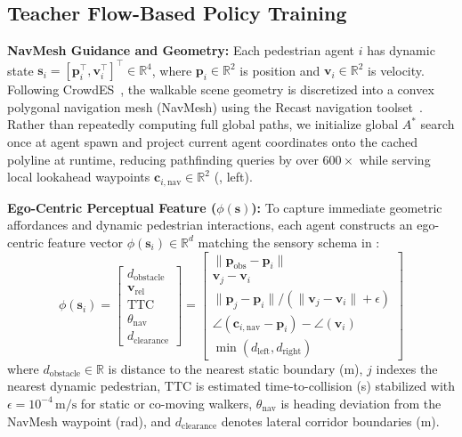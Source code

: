 \documentclass{sice-si}
\begin{document}
\subsection{Teacher Flow-Based Policy Training}
\textbf{NavMesh Guidance and Geometry:} 
Each pedestrian agent $i$ has dynamic state $\mathbf{s}_i = [\mathbf{p}_i^\top, \mathbf{v}_i^\top]^\top \in \mathbb{R}^4$, where $\mathbf{p}_i \in \mathbb{R}^2$ is position and $\mathbf{v}_i \in \mathbb{R}^2$ is velocity. Following CrowdES~\cite{bae2025crowdes}, the walkable scene geometry is discretized into a convex polygonal navigation mesh (NavMesh) using the Recast navigation toolset~\cite{mononen2009recast}. Rather than repeatedly computing full global paths, we initialize global $A^*$ search once at agent spawn and project current agent coordinates onto the cached polyline at runtime, reducing pathfinding queries by over $600\times$ while serving local lookahead waypoints $\mathbf{c}_{i, \text{nav}} \in \mathbb{R}^2$ (, left).

\textbf{Ego-Centric Perceptual Feature ($\phi(\mathbf{s})$):}
To capture immediate geometric affordances and dynamic pedestrian interactions, each agent constructs an ego-centric feature vector $\phi(\mathbf{s}_i) \in \mathbb{R}^d$ matching the sensory schema in :
\begin{equation}
    \phi(\mathbf{s}_i) = \begin{bmatrix}
    d_{\text{obstacle}} \\
    \mathbf{v}_{\text{rel}} \\
    \text{TTC} \\
    \theta_{\text{nav}} \\
    d_{\text{clearance}}
    \end{bmatrix} = \begin{bmatrix}
    \|\mathbf{p}_{\text{obs}} - \mathbf{p}_i\| \\
    \mathbf{v}_j - \mathbf{v}_i \\
    \|\mathbf{p}_j - \mathbf{p}_i\| / (\|\mathbf{v}_j - \mathbf{v}_i\| + \epsilon) \\
    \angle(\mathbf{c}_{i, \text{nav}} - \mathbf{p}_i) - \angle(\mathbf{v}_i) \\
    \min(d_{\text{left}}, d_{\text{right}})
    \end{bmatrix}
\end{equation}
where $d_{\text{obstacle}} \in \mathbb{R}$ is distance to the nearest static boundary (m), $j$ indexes the nearest dynamic pedestrian, $\text{TTC}$ is estimated time-to-collision (s) stabilized with $\epsilon = 10^{-4}\,\text{m/s}$ for static or co-moving walkers, $\theta_{\text{nav}}$ is heading deviation from the NavMesh waypoint (rad), and $d_{\text{clearance}}$ denotes lateral corridor boundaries (m).
\end{document}
